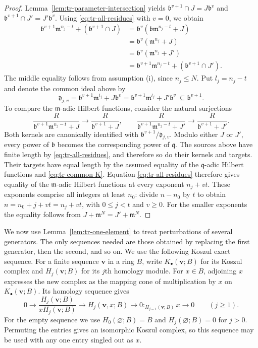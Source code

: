 \documentclass[11pt,reqno]{amsart}
\numberwithin{equation}{section}
\theoremstyle{definition}
\begin{document}
\begin{proof}
Lemma~\ref{lem:tr-parameter-intersection} yields
$\mathfrak b^{v+1}\cap J=J\mathfrak b^v$ and $\mathfrak b^{v+1}\cap J'=J'\mathfrak b^v$.
Using \eqref{eq:tr-all-residues} with $v=0$, we obtain
\begin{align*}
 \mathfrak b^{v+1}\mathfrak m^{n_j-t}+(\mathfrak b^{v+1}\cap J)
 &=\mathfrak b^v(\mathfrak b\mathfrak m^{n_j-t}+J)\\
 &=\mathfrak b^v(\mathfrak m^{n_j}+J)\\
 &=\mathfrak b^v(\mathfrak m^{n_j}+J')\\
 &=\mathfrak b^{v+1}\mathfrak m^{n_j-t}+(\mathfrak b^{v+1}\cap J').
\end{align*}
The middle equality follows from assumption (i), since $n_j\leq N$.
Put $l_j=n_j-t$ and denote the common ideal above by
\[
 \mathfrak d_{j,v}=\mathfrak b^{v+1}\mathfrak m^{l_j}+J\mathfrak b^v
        =\mathfrak b^{v+1}\mathfrak m^{l_j}+J'\mathfrak b^v
        \ \subseteq \mathfrak b^{v+1}.
\]
To compare the $\mathfrak m$-adic Hilbert functions, consider the natural surjections
\[
 \frac{R}{\mathfrak b^{v+1}\mathfrak m^{n_j-t}+J}
 \longrightarrow\frac{R}{\mathfrak b^{v+1}+J},
 \qquad
 \frac{R}{\mathfrak b^{v+1}\mathfrak m^{n_j-t}+J'}
 \longrightarrow\frac{R}{\mathfrak b^{v+1}+J'}.
\]
Both kernels are canonically identified with
$\mathfrak b^{v+1}/\mathfrak d_{j,v}$.
Modulo either $J$ or $J'$, every power of $\mathfrak b$ becomes the
corresponding power of $\mathfrak q$. The sources above have finite
length by \eqref{eq:tr-all-residues}, and therefore so do their
kernels and targets. Their targets have equal length by the assumed
equality of the $\mathfrak q$-adic Hilbert functions and \eqref{eq:tr-common-K}.
Equation \eqref{eq:tr-all-residues} therefore gives equality of the
$\mathfrak m$-adic Hilbert functions at every exponent $n_j+vt$.
These exponents comprise all integers at least $n_0$: divide
$n-n_0$ by $t$ to obtain $n=n_0+j+vt=n_j+vt$, with
$0\leq j<t$ and $v\geq0$.
For the smaller exponents the equality follows from
$J+\mathfrak m^N=J'+\mathfrak m^N$.
\end{proof}

We now use Lemma~\ref{lem:tr-one-element} to treat perturbations
of several generators. The only sequences needed are those
obtained by replacing the first
generator, then the second, and so on. We use the following
Koszul exact sequence. For a finite sequence $\mathbf v$ in a ring $B$,
write $K_\bullet(\mathbf v;B)$ for its Koszul complex and
$H_j(\mathbf v;B)$ for its $j$th homology module. For $x\in B$,
adjoining $x$ expresses the new complex as the mapping cone of
multiplication by $x$ on $K_\bullet(\mathbf v;B)$.
Its homology sequence gives
\begin{equation}\label{eq:tr-koszul-adjunction}
 0\longrightarrow
 \frac{H_j(\mathbf v;B)}{xH_j(\mathbf v;B)}
 \longrightarrow H_j(\mathbf v,x;B)
 \longrightarrow 0:_{H_{j-1}(\mathbf v;B)}x
 \longrightarrow0\qquad(j\geq1).
\end{equation}
For the empty sequence we use $H_0(\varnothing;B)=B$ and
$H_j(\varnothing;B)=0$ for $j>0$.
Permuting the entries gives an isomorphic Koszul complex, so
this sequence may be used with any one entry singled out as $x$.
\end{document}

